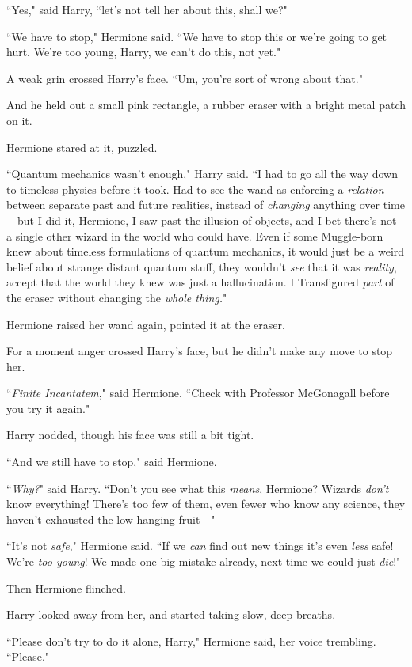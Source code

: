 ``Yes," said Harry, ``let's not tell her about this, shall we?"

``We have to stop," Hermione said. ``We have to stop this or we're going to get hurt. We're too young, Harry, we can't do this, not yet."

A weak grin crossed Harry's face. ``Um, you're sort of wrong about that."

And he held out a small pink rectangle, a rubber eraser with a bright metal patch on it.

Hermione stared at it, puzzled.

``Quantum mechanics wasn't enough," Harry said. ``I had to go all the way down to timeless physics before it took. Had to see the wand as enforcing a \emph{relation} between separate past and future realities, instead of \emph{changing} anything over time—but I did it, Hermione, I saw past the illusion of objects, and I bet there's not a single other wizard in the world who could have. Even if some Muggle-born knew about timeless formulations of quantum mechanics, it would just be a weird belief about strange distant quantum stuff, they wouldn't \emph{see} that it was \emph{reality}, accept that the world they knew was just a hallucination. I Transfigured \emph{part} of the eraser without changing the \emph{whole thing.}"

Hermione raised her wand again, pointed it at the eraser.

For a moment anger crossed Harry's face, but he didn't make any move to stop her.

``\emph{Finite Incantatem}," said Hermione. ``Check with Professor McGonagall before you try it again."

Harry nodded, though his face was still a bit tight.

``And we still have to stop," said Hermione.

``\emph{Why?}" said Harry. ``Don't you see what this \emph{means}, Hermione? Wizards \emph{don't} know everything! There's too few of them, even fewer who know any science, they haven't exhausted the low-hanging fruit—"

``It's not \emph{safe}," Hermione said. ``If we \emph{can} find out new things it's even \emph{less} safe! We're \emph{too young}! We made one big mistake already, next time we could just \emph{die}!"

Then Hermione flinched.

Harry looked away from her, and started taking slow, deep breaths.

``Please don't try to do it alone, Harry," Hermione said, her voice trembling. ``Please."

